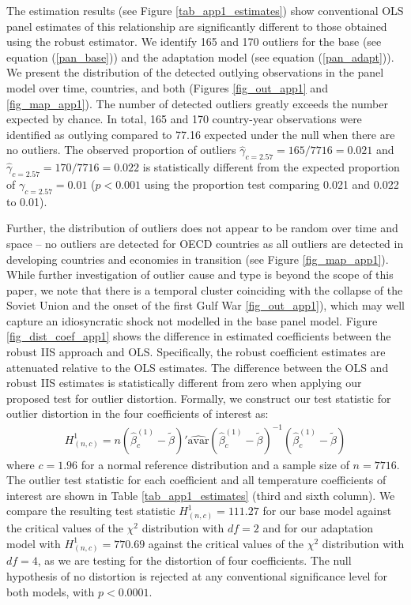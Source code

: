 \documentclass[11pt, letterpaper]{article}
\numberwithin{algorithm}{section}
\numberwithin{assumption}{section}
\numberwithin{lemma}{section}
\numberwithin{theorem}{section}
\numberwithin{corollary}{section}
\numberwithin{remark}{section}
\numberwithin{equation}{section}
\numberwithin{figure}{section}
\numberwithin{table}{section}
\begin{document}
The estimation results (see Figure \ref{tab_app1_estimates}) show conventional OLS panel estimates of this relationship are significantly different to those obtained using the robust estimator. We identify 165 and 170 outliers for the base (see equation (\ref{pan_base})) and the adaptation model (see equation (\ref{pan_adapt})). We present the distribution of the detected outlying observations in the panel model over time, countries, and both (Figures \ref{fig_out_app1} and \ref{fig_map_app1}). The number of detected outliers greatly exceeds the number expected by chance. In total, 165 and 170 country-year observations were identified as outlying compared to 77.16 expected under the null when there are no outliers. The observed proportion of outliers $\hat{\gamma}_{c=2.57}= 165/7716=0.021$ and $\hat{\gamma}_{c=2.57}= 170/7716=0.022$ is statistically different from the expected proportion of $\gamma_{c=2.57}=0.01$ ($p<0.001$ using the \citet{jiao2018testing} proportion test comparing 0.021 and 0.022 to 0.01).

Further, the distribution of outliers does not appear to be random over time and space -- no outliers are detected for OECD countries as all outliers are detected in developing countries and economies in transition (see Figure \ref{fig_map_app1}). While further investigation of outlier cause and type is beyond the scope of this paper, we note that there is a temporal cluster coinciding with the collapse of the Soviet Union and the onset of the first Gulf War \ref{fig_out_app1}), which may well capture an idiosyncratic shock not modelled in the base panel model.
Figure \ref{fig_dist_coef_app1} shows the difference in estimated coefficients between the robust IIS approach and OLS. Specifically, the robust coefficient estimates are attenuated relative to the OLS estimates. The difference between the OLS and robust IIS estimates is statistically different from zero when applying our proposed test for outlier distortion. Formally, we construct our test statistic for outlier distortion in the four coefficients of interest as:
\begin{eqnarray}
H^{1}_{(n,c)} = n \left( \hat{\beta}^{( 1)}_{c} - \tilde{\beta} \right)'\widehat{\mbox{avar}}\left( \hat{\beta}^{( 1)}_{c} - \tilde{\beta} \right)^{-1}\left( \hat{\beta}^{( 1)}_{c} - \tilde{\beta} \right)
\end{eqnarray}
where $c=1.96$ for a normal reference distribution and a sample size of $n=7716$. The outlier test statistic for each coefficient and all temperature coefficients of interest are shown in Table \ref{tab_app1_estimates} (third and sixth column). We compare the resulting test statistic $H^{1}_{(n,c)} = 111.27$ for our base model against the critical values of the $\chi^{2}$ distribution with $df=2$ and for our adaptation model with $H^{1}_{(n,c)} = 770.69$ against the critical values of the $\chi^{2}$ distribution with $df=4$, as we are testing for the distortion of four coefficients. The null hypothesis of no distortion is rejected at any conventional significance level for both models, with $p<0.0001$.
\end{document}
